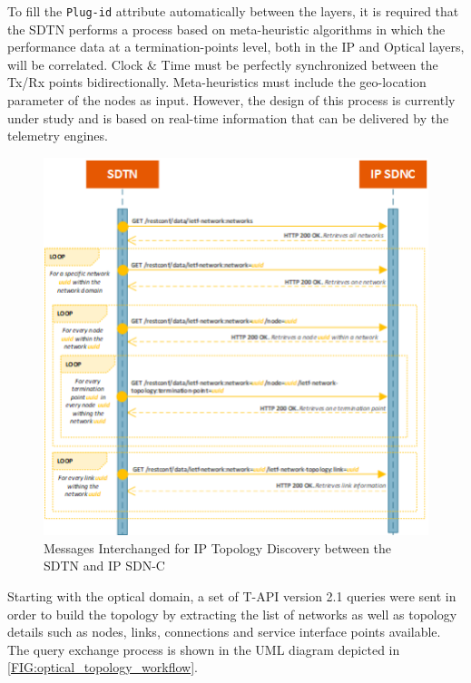\documentclass[a4paper,fleqn]{cas-dc}
\begin{document}
To fill the \texttt{Plug-id} attribute automatically between the layers, it is required that the SDTN performs a process based on meta-heuristic algorithms in which the performance data at a termination-points level, both in the IP and Optical layers, will be correlated. Clock \& Time must be perfectly synchronized between the Tx/Rx points bidirectionally. Meta-heuristics must include the geo-location parameter of the nodes as input. However, the design of this process is currently under study and is based on real-time information that can be delivered by the telemetry engines.

\begin{figure}
	\centering
		\includegraphics[width=\linewidth]{figs/ip_topology_workflow.png}
	\caption{Messages Interchanged for IP Topology Discovery between the SDTN and IP SDN-C}
	\label{FIG:ip_topology_workflow}
\end{figure}

Starting with the optical domain, a set of T-API version 2.1 queries were sent in order to build the topology by extracting the list of networks as well as topology details such as nodes, links, connections and service interface points available. The query exchange process is shown in the UML diagram depicted in \cref{FIG:optical_topology_workflow}.  
\end{document}
